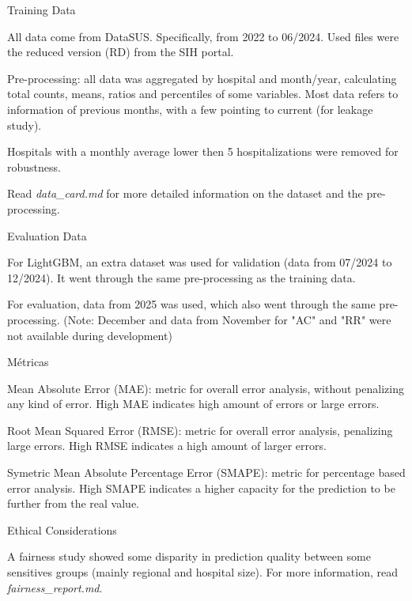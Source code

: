 \documentclass{article}
\begin{document}
\begin{singlespace}
\begin{tcolorbox}[title=\textbf{Model Card - NIAR Toy Example},
    breakable, sharp corners, boxrule=0.7pt]
{\begin{mcsection}{Training Data}
    \item All data come from DataSUS. Specifically, from 2022 to 06/2024. Used files were the reduced version (RD) from the SIH portal.
    \item Pre-processing: all data was aggregated by hospital and month/year, calculating total counts, means, ratios and percentiles of some variables. Most data refers to information of previous months, with a few pointing to current (for leakage study).
    \item Hospitals with a monthly average lower then 5 hospitalizations were removed for robustness.
    \item Read \textit{data\_card.md} for more detailed information on the dataset and the pre-processing.
\end{mcsection}

\begin{mcsection}{Evaluation Data}
    \item For LightGBM, an extra dataset was used for validation (data from 07/2024 to 12/2024). It went through the same pre-processing as the training data.
    \item For evaluation, data from 2025 was used, which also went through the same pre-processing. (Note: December and data from November for "AC" and "RR" were not available during development)
\end{mcsection}

\begin{mcsection}{Métricas}
    \item Mean Absolute Error (MAE): metric for overall error analysis, without penalizing any kind of error. High MAE indicates high amount of errors or large errors.
    \item Root Mean Squared Error (RMSE): metric for overall error analysis, penalizing large errors. High RMSE indicates a high amount of larger errors.
    \item Symetric Mean Absolute Percentage Error (SMAPE): metric for percentage based error analysis. High SMAPE indicates a higher capacity for the prediction to be further from the real value.
\end{mcsection}

\begin{mcsection}{Ethical Considerations}
    \item A fairness study showed some disparity in prediction quality between some sensitives groups (mainly regional and hospital size). For more information, read \textit{fairness\_report.md}.
\end{mcsection}

}
\end{tcolorbox}
\end{singlespace}
\end{document}
